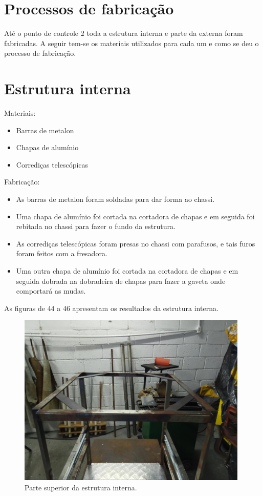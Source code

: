 \section{Processos de fabricação}

Até o ponto de controle 2 toda a estrutura interna e parte da externa foram fabricadas. A seguir tem-se os materiais utilizados para cada um e como se deu o processo de fabricação.

\section{Estrutura interna}

Materiais:
\begin{itemize}
	\item	Barras de metalon
	\item	Chapas de alumínio
	\item	Corrediças telescópicas
\end{itemize}

Fabricação:
\begin{itemize}
	\item	As barras de metalon foram soldadas para dar forma ao chassi.
	\item	Uma chapa de alumínio foi cortada na cortadora de chapas e em seguida foi rebitada no chassi para fazer o fundo da estrutura.
	\item	As corrediças telescópicas foram presas no chassi com parafusos, e tais furos foram feitos com a fresadora.
	\item	Uma outra chapa de alumínio foi cortada na cortadora de chapas e em seguida dobrada na dobradeira de chapas para fazer a gaveta onde comportará as mudas.
\end{itemize}

As figuras de 44 a 46 apresentam os resultados da estrutura interna.

\begin{figure}[H]
	\centering
	\includegraphics[width=11cm]{figuras/resultado_1.jpg}
	\caption{Parte superior da estrutura interna.} \label{resultado_1}
\end{figure}

